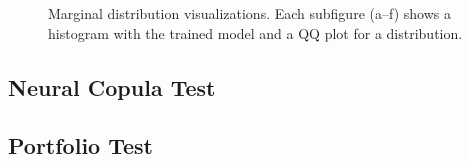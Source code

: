\begin{figure}
    \caption{Marginal distribution visualizations. Each subfigure (a--f) shows a histogram with the trained model and a QQ plot for a distribution.}
    \label{fig:MarginalResults}
\end{figure}


\subsection{Neural Copula Test}



\subsection{Portfolio Test}